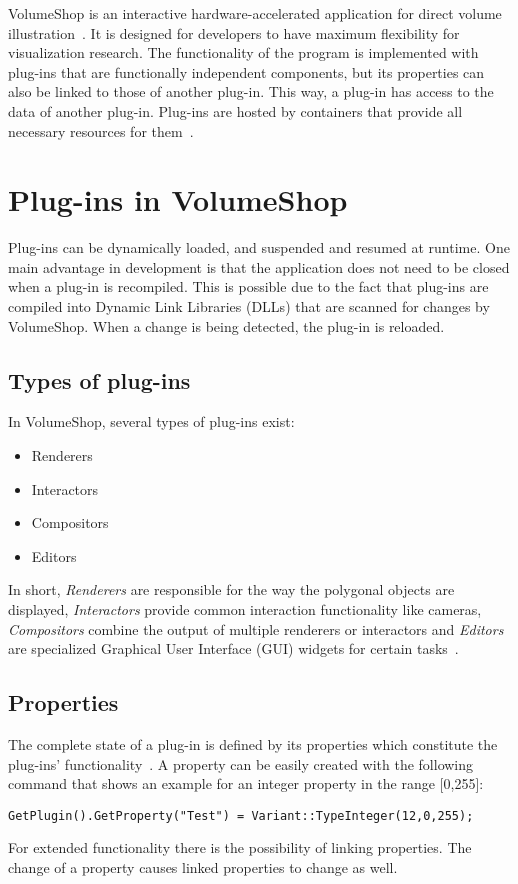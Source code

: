
VolumeShop is an interactive hardware-accelerated application for direct volume illustration~\cite{proc:volumeshop}. It is designed for developers to have maximum flexibility for visualization research. The functionality of the program is implemented with plug-ins that are functionally independent components, but its properties can also be linked to those of another plug-in. This way, a plug-in has access to the data of another plug-in. Plug-ins are hosted by containers that provide all necessary resources for them~\cite{misc:volumeshop101}.

\section{Plug-ins in VolumeShop}
Plug-ins can be dynamically loaded, and suspended and resumed at runtime. One main advantage in development is that the application does not need to be closed when a plug-in is recompiled. This is possible due to the fact that plug-ins are compiled into Dynamic Link Libraries (DLLs) that are scanned for changes by VolumeShop. When a change is being detected, the plug-in is reloaded.

\subsection{Types of plug-ins}
In VolumeShop, several types of plug-ins exist:
\begin{itemize}
	\item Renderers
	\item Interactors
	\item Compositors
	\item Editors
\end{itemize}

In short, \emph{Renderers} are responsible for the way the polygonal objects are displayed, \emph{Interactors} provide common interaction functionality like cameras, \emph{Compositors} combine the output of multiple renderers or interactors and \emph{Editors} are specialized Graphical User Interface (GUI) widgets for certain tasks~\cite{misc:volumeshop101}.

\subsection{Properties}
The complete state of a plug-in is defined by its properties which constitute the plug-ins' functionality~\cite{misc:volumeshop101}. A property can be easily created with the following command that shows an example for an integer property in the range [0,255]:
\begin{lstlisting}
GetPlugin().GetProperty("Test") = Variant::TypeInteger(12,0,255);
\end{lstlisting}
For extended functionality there is the possibility of linking properties. The change of a property causes linked properties to change as well.

